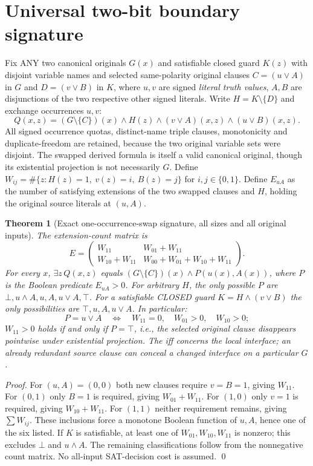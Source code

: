 \documentclass[11pt]{article}
\newtheorem{theorem}{Theorem}
\begin{document}
\section{Universal two-bit boundary signature}
Fix ANY two canonical originals $G(x)$ and satisfiable closed guard $K(z)$ with disjoint variable names and selected same-polarity original clauses
$C=(u\lor A)$ in $G$ and $D=(v\lor B)$ in $K$, where $u,v$ are signed \emph{literal truth values}, $A,B$ are disjunctions of the two respective other signed literals. Write $H=K\setminus\{D\}$ and exchange occurrences $u,v$:
\[
Q(x,z)=(G\setminus\{C\})(x)\wedge H(z)\wedge(v\lor A)(x,z)\wedge(u\lor B)(x,z).
\]
All signed occurrence quotas, distinct-name triple clauses, monotonicity and duplicate-freedom are retained, because the two original variable sets were disjoint. The swapped derived formula is itself a valid canonical original, though its existential projection is not necessarily $G$.
Define $W_{ij}=\#\{z:H(z)=1,\ v(z)=i,\ B(z)=j\}$ for $i,j\in\{0,1\}$. Define $E_{uA}$ as the number of satisfying extensions of the two swapped clauses and $H$, holding the original source literals at $(u,A)$.
\begin{theorem}[Exact one-occurrence-swap signature, all sizes and all original inputs]
The extension-count matrix is
\[
\boxed{
E=\begin{pmatrix}
W_{11}&W_{01}+W_{11}\\
W_{10}+W_{11}&W_{00}+W_{01}+W_{10}+W_{11}
\end{pmatrix}.}
\]
For every $x$, $\exists z\,Q(x,z)$ equals $(G\setminus\{C\})(x)\wedge P(u(x),A(x))$, where $P$ is the Boolean predicate $E_{uA}>0$. For arbitrary $H$, the only possible $P$ are $\bot,u\wedge A,u,A,u\vee A,\top$. For a satisfiable CLOSED guard $K=H\wedge(v\vee B)$ the only possibilities are $\top,u,A,u\vee A$. In particular:
\[
P=u\vee A\quad\Longleftrightarrow\quad
W_{11}=0,\quad W_{01}>0,\quad W_{10}>0;
\]
$W_{11}>0$ holds if and only if $P=\top$, i.e., the selected original clause disappears pointwise under existential projection. The iff concerns the \emph{local interface}; an already redundant source clause can conceal a changed interface on a particular $G$.
\end{theorem}
\begin{proof}
For $(u,A)=(0,0)$ both new clauses require $v=B=1$, giving $W_{11}$. For $(0,1)$ only $B=1$ is required, giving $W_{01}+W_{11}$. For $(1,0)$ only $v=1$ is required, giving $W_{10}+W_{11}$. For $(1,1)$ neither requirement remains, giving $\sum W_{ij}$. These inclusions force a monotone Boolean function of $u,A$, hence one of the six listed. If $K$ is satisfiable, at least one of $W_{01},W_{10},W_{11}$ is nonzero; this excludes $\bot$ and $u\land A$. The remaining classifications follow from the nonnegative count matrix. No all-input SAT-decision cost is assumed. \qed
\end{proof}
\end{document}
